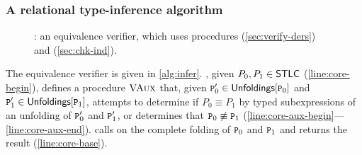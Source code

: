 \subsubsection{A relational type-inference algorithm}
\label{sec:infer-alg}

\begin{figure}
  \centering
\begin{algorithm}[H]
  { 
  }
  \caption{%
    \verify: an equivalence verifier, which uses procedures
    \verifybnd (\autoref{sec:verify-ders}) and %
    \chkinductive (\autoref{sec:chk-ind}).  }
  \label{alg:infer}
\end{algorithm}
\end{figure}

The equivalence verifier \verify is given in \autoref{alg:infer}.
%
\verify, given $P_0, P_1 \in \mathsf{STLC}$ (\autoref{line:core-begin}),
defines a procedure $\textsc{VAux}$ that, given $\cc{P}_0' \in
\unfoldings{ \cc{P}_0 }$ and $\cc{P}_1' \in \unfoldings{ \cc{P}_1 }$,
attempts to determine if $P_0 \equiv P_1$ by typed subexpressions of
an unfolding 
%
%
of $\cc{P}_0'$ and $\cc{P}_1'$, or determines that $\cc{P}_0
\not\equiv \cc{P}_1$
(\autoref{line:core-aux-begin}---\autoref{line:core-aux-end}).
%
\verify calls \verifyaux on the complete folding of $\cc{P}_0$ and
$\cc{P}_1$ and returns the result (\autoref{line:core-base}).

